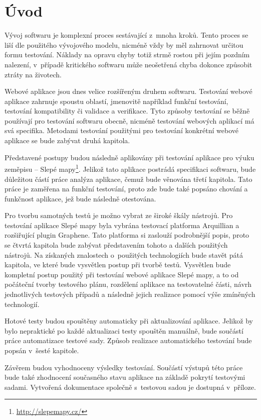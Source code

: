 \documentclass[
    color,   %
	table,   %
    twoside, %
]{fithesis3}
\begin{document}
\chapter{Úvod}
Vývoj softwaru je komplexní proces sestávající z~mnoha kroků. Tento proces se liší dle použitého vývojového modelu, nicméně vždy by měl zahrnovat určitou formu testování. Náklady na opravu chyby totiž strmě rostou při jejím pozdním nalezení, v~případě kritického softwaru může neošetřená chyba dokonce způsobit ztráty na životech.

Webové aplikace jsou dnes velice rozšířeným druhem softwaru. Testování webové aplikace zahrnuje spoustu oblastí, jmenovitě například funkční testování, testování kompatibility či validace a verifikace. Tyto způsoby testování se běžně používají pro testování softwaru obecně, nicméně testování webových aplikací má svá specifika. Metodami testování použitými pro testování konkrétní webové aplikace se bude zabývat druhá kapitola.

Představené postupy budou následně aplikovány při testování aplikace pro výuku zeměpisu – Slepé mapy\footnote{\url{http://slepemapy.cz/}}. Jelikož tato aplikace postrádá specifikaci softwaru, bude důležitou částí práce analýza aplikace, čemuž bude věnována třetí kapitola. Tato práce je zaměřena na funkční testování, proto zde bude také popsáno chování a funkčnost aplikace, jež bude následně otestována.

Pro tvorbu samotných testů je možno vybrat ze široké škály nástrojů. Pro testování aplikace Slepé mapy byla vybrána testovací platforma Arquillian a rozšiřující plugin Graphene. Tato platforma si zaslouží podrobnější popis, proto se čtvrtá kapitola bude zabývat představením tohoto a dalších použitých nástrojů.
Na získaných znalostech o~použitých technologiích bude stavět pátá kapitola, ve které bude vysvětlen postup při tvorbě testů. Vysvětlen bude kompletní postup použitý při testování webové aplikace Slepé mapy, a to od počáteční tvorby testového plánu, rozdělení aplikace na testovatelné části, návrh jednotlivých testových případů a následně jejich realizace pomocí výše zmíněných technologií.

Hotové testy budou spouštěny automaticky při aktualizování aplikace. Jelikož by bylo  nepraktické po každé aktualizaci testy spouštěn manuálně, bude součástí práce automatizace testové sady. Způsob realizace automatického testování bude popsán v~šesté kapitole.

Závěrem budou vyhodnoceny výsledky testování. Součástí výstupů této práce bude také zhodnocení současného stavu aplikace na základě pokrytí testovými sadami. Vytvořená dokumentace společně s~testovou sadou je dostupná v~příloze.
\end{document}

